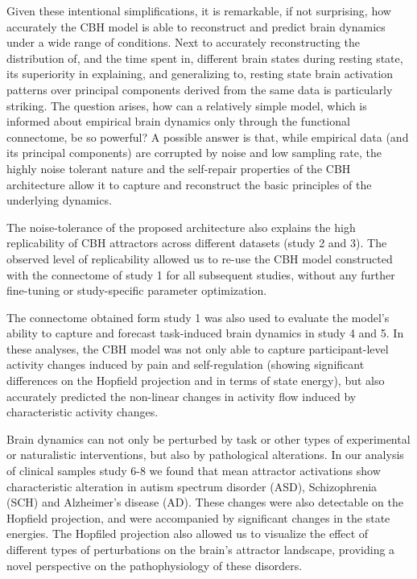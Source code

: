 \documentclass{article}
\begin{document}
Given these intentional simplifications, it is remarkable, if not surprising, how accurately the CBH model is able to
reconstruct and predict brain dynamics under a wide range of conditions. Next to accurately reconstructing the
distribution of, and the time spent in, different brain states during resting state, its superiority in explaining, and
generalizing to, resting state brain activation patterns over principal components derived from the same data is
particularly striking. The question arises, how can a relatively simple model, which is informed about empirical brain
dynamics only through the functional connectome, be so powerful? A possible answer is that, while empirical data (and
its principal components) are corrupted by noise and low sampling rate, the highly noise tolerant nature and the
self-repair properties of the CBH architecture allow it to capture and reconstruct the basic principles of the
underlying dynamics.

The noise-tolerance of the proposed architecture also explains the high replicability of CBH attractors across different
datasets (study 2 and 3). The observed level of replicability allowed us to re-use the CBH model constructed with the
connectome of study 1 for all subsequent studies, without any further fine-tuning or study-specific parameter
optimization.

The connectome obtained form study 1 was also used to evaluate the model's ability to capture and forecast task-induced
brain dynamics in study 4 and 5. In these analyses, the CBH model was not only able to capture participant-level
activity changes induced by pain and self-regulation (showing significant differences on the Hopfield projection and in
terms of state energy), but also accurately predicted the non-linear changes in activity flow induced by characteristic
activity changes.

Brain dynamics can not only be perturbed by task or other types of experimental or naturalistic interventions, but also
by pathological alterations. In our analysis of clinical samples study 6-8 we found that mean attractor activations show
characteristic alteration in autism spectrum disorder (ASD), Schizophrenia (SCH) and Alzheimer's disease (AD). These
changes were also detectable on the Hopfield projection, and were accompanied by significant changes in the state
energies. The Hopfiled projection also allowed us to visualize the effect of different types of perturbations on the
brain's attractor landscape, providing a novel perspective on the pathophysiology of these disorders.
\end{document}
